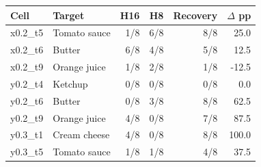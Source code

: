 \begin{tabular}{llrrrr}
\toprule
Cell & Target & H16 & H8 & Recovery & $\Delta$ pp \\
\midrule
x0.2\_t5 & Tomato sauce & 1/8 & 6/8 & 8/8 & 25.0 \\
x0.2\_t6 & Butter & 6/8 & 4/8 & 5/8 & 12.5 \\
x0.2\_t9 & Orange juice & 1/8 & 2/8 & 1/8 & -12.5 \\
y0.2\_t4 & Ketchup & 0/8 & 0/8 & 0/8 & 0.0 \\
y0.2\_t6 & Butter & 0/8 & 3/8 & 8/8 & 62.5 \\
y0.2\_t9 & Orange juice & 4/8 & 0/8 & 7/8 & 87.5 \\
y0.3\_t1 & Cream cheese & 4/8 & 0/8 & 8/8 & 100.0 \\
y0.3\_t5 & Tomato sauce & 1/8 & 1/8 & 4/8 & 37.5 \\
\bottomrule
\end{tabular}
